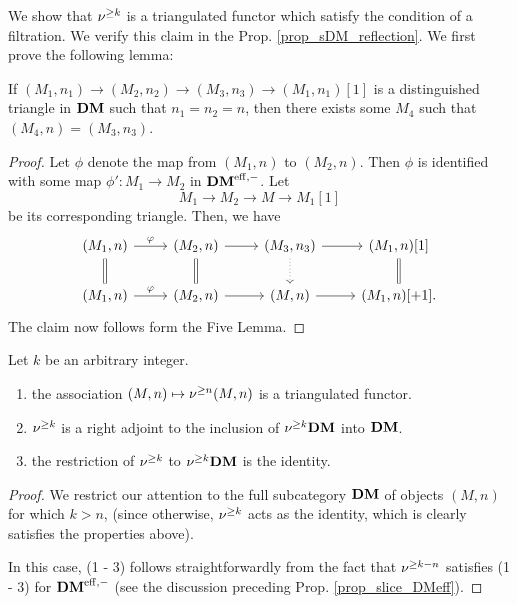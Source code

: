 We show that $\nu^{\geq k}$ is a triangulated functor which satisfy 
the condition of a filtration. We verify this claim in the 
Prop. \ref{prop_sDM_reflection}. We first prove the following
lemma:

\begin{lem}\label{lem_triangle_in_DM}
If $(M_1, n_1) \to (M_2, n_2) \to (M_3, n_3) \to (M_1, n_1)[1]$
is a distinguished triangle in $\mathbf{DM}$ such that $n_1 = n_2 = n$, 
then there exists some $M_4$ such that $(M_4, n) = (M_3, n_3)$.
\end{lem}
\begin{proof}
Let $\phi$ denote the map from $(M_1, n)$ to $(M_2, n)$. Then
$\phi$ is identified with some map $\phi': M_1 \to M_2$ in 
$\mathbf{DM}^{\mathrm{eff},-}$. Let
\[
M_1 \to M_2 \to M \to M_1[1]
\]
be its corresponding triangle. Then, we have
\[
\begin{tikzcd}
(M_1, n) \arrow{r}{\phi} \arrow[equals]{d} &
(M_2, n) \arrow{r} \arrow[equals]{d} &
(M_3, n_3) \arrow{r} \arrow[dotted]{d} &
(M_1, n)[1] \arrow[equals]{d}\\
(M_1, n) \arrow{r}{\phi} &
(M_2, n) \arrow{r} &
(M, n) \arrow{r} &
(M_1, n)[+1].
\end{tikzcd}
\]
The claim now follows form the Five Lemma.
\end{proof}

\begin{prop}\label{prop_sDM_reflection}
Let $k$ be an arbitrary integer.

\begin{enumerate}
\item the association $(M, n) \mapsto \nu^{\geq n} (M, n)$ is 
a triangulated functor.

\item $\nu^{\geq k}$ is a right adjoint to the inclusion of 
$\nu^{\geq k}\mathbf{DM}$ into $\mathbf{DM}$.

\item the restriction of $\nu^{\geq k}$ to $\nu^{\geq k} \mathbf{DM}$ is the 
identity.
\end{enumerate}
\end{prop}
\begin{proof}
We restrict our attention to the full subcategory $\mathbf{DM}$ of objects 
$(M, n)$ for which $k > n$, (since otherwise, $\nu^{\geq k}$ acts as 
the identity, which is clearly satisfies the properties above).

In this case, (1 - 3) follows straightforwardly from the fact that
$\nu^{\geq k - n}$ satisfies (1 - 3) for $\mathbf{DM}^{\mathrm{eff},-}$ (see the discussion
preceding Prop. \ref{prop_slice_DMeff}).
\end{proof}

